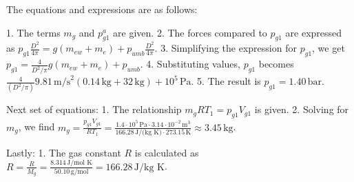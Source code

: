 The equations and expressions are as follows:

1. The terms \( m_g \) and \( p_{g1}^a \) are given.
2. The forces compared to \( p_{g1} \) are expressed as \( p_{g1} \frac{D^2}{4 \pi} = g (m_{ew} + m_e) + p_{umb} \frac{D^2}{4 \pi} \).
3. Simplifying the expression for \( p_{g1} \), we get \( p_{g1} = \frac{4}{D^2 / \pi} g (m_{ew} + m_e) + p_{umb} \).
4. Substituting values, \( p_{g1} \) becomes \( \frac{4}{(D^2 / \pi)} 9.81 \, \text{m/s}^2 (0.14 \, \text{kg} + 32 \, \text{kg}) + 10^5 \, \text{Pa} \).
5. The result is \( p_{g1} = 1.40 \, \text{bar} \).

Next set of equations:
1. The relationship \( m_g R T_1 = p_{g1} V_{g1} \) is given.
2. Solving for \( m_g \), we find \( m_g = \frac{p_{g1} V_{g1}}{R T_1} = \frac{1.4 \cdot 10^5 \, \text{Pa} \cdot 3.14 \cdot 10^{-2} \, \text{m}^3}{166.28 \, \text{J/(kg K)} \cdot 273.15 \, \text{K}} \approx 3.45 \, \text{kg} \).

Lastly:
1. The gas constant \( R \) is calculated as \( R = \frac{R}{M_g} = \frac{8.314 \, \text{J/mol K}}{50.10 \, \text{g/mol}} = 166.28 \, \text{J/kg K} \).